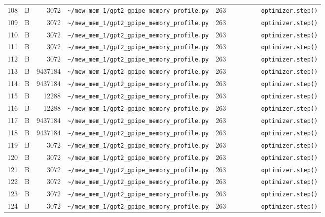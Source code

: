 \documentclass{article}
\begin{document}
\begin{longtable}{r l r p{6.5cm} r p{7.0cm}}
108 & B & 3072 & \lstinline|~/mew_mem_1/gpt2_gpipe_memory_profile.py| & 263 & \lstinline|        optimizer.step()| \\
109 & B & 3072 & \lstinline|~/mew_mem_1/gpt2_gpipe_memory_profile.py| & 263 & \lstinline|        optimizer.step()| \\
110 & B & 3072 & \lstinline|~/mew_mem_1/gpt2_gpipe_memory_profile.py| & 263 & \lstinline|        optimizer.step()| \\
111 & B & 3072 & \lstinline|~/mew_mem_1/gpt2_gpipe_memory_profile.py| & 263 & \lstinline|        optimizer.step()| \\
112 & B & 3072 & \lstinline|~/mew_mem_1/gpt2_gpipe_memory_profile.py| & 263 & \lstinline|        optimizer.step()| \\
113 & B & 9437184 & \lstinline|~/mew_mem_1/gpt2_gpipe_memory_profile.py| & 263 & \lstinline|        optimizer.step()| \\
114 & B & 9437184 & \lstinline|~/mew_mem_1/gpt2_gpipe_memory_profile.py| & 263 & \lstinline|        optimizer.step()| \\
115 & B & 12288 & \lstinline|~/mew_mem_1/gpt2_gpipe_memory_profile.py| & 263 & \lstinline|        optimizer.step()| \\
116 & B & 12288 & \lstinline|~/mew_mem_1/gpt2_gpipe_memory_profile.py| & 263 & \lstinline|        optimizer.step()| \\
117 & B & 9437184 & \lstinline|~/mew_mem_1/gpt2_gpipe_memory_profile.py| & 263 & \lstinline|        optimizer.step()| \\
118 & B & 9437184 & \lstinline|~/mew_mem_1/gpt2_gpipe_memory_profile.py| & 263 & \lstinline|        optimizer.step()| \\
119 & B & 3072 & \lstinline|~/mew_mem_1/gpt2_gpipe_memory_profile.py| & 263 & \lstinline|        optimizer.step()| \\
120 & B & 3072 & \lstinline|~/mew_mem_1/gpt2_gpipe_memory_profile.py| & 263 & \lstinline|        optimizer.step()| \\
121 & B & 3072 & \lstinline|~/mew_mem_1/gpt2_gpipe_memory_profile.py| & 263 & \lstinline|        optimizer.step()| \\
122 & B & 3072 & \lstinline|~/mew_mem_1/gpt2_gpipe_memory_profile.py| & 263 & \lstinline|        optimizer.step()| \\
123 & B & 3072 & \lstinline|~/mew_mem_1/gpt2_gpipe_memory_profile.py| & 263 & \lstinline|        optimizer.step()| \\
124 & B & 3072 & \lstinline|~/mew_mem_1/gpt2_gpipe_memory_profile.py| & 263 & \lstinline|        optimizer.step()| \\

\end{longtable}
\end{document}
